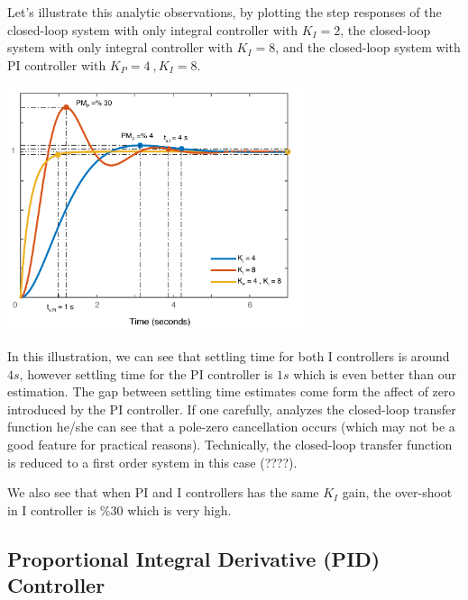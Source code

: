 \documentclass[twoside]{article}
\begin{document}
Let's illustrate this analytic observations, by
plotting the step responses of the
closed-loop system with only integral controller with $K_I = 2$,
the closed-loop system with only integral controller with $K_I = 8$, 
and the closed-loop system with PI controller with $K_P = 4 \ , K_I = 8$. 

\vspace{12 pt}

  \begin{minipage}[h]{1\linewidth}
    \begin{center}
      \includegraphics[width=0.65\textwidth]{IvsPI}
    \end{center}
  \end{minipage}

\vspace{12 pt}

In this illustration, we can see that settling time for both
I controllers is around $4 s$, however settling time for the
PI controller is $1 s$ which is even better than our estimation. 
The gap between settling time estimates come form the affect
of zero introduced by the PI controller. If one carefully, analyzes
the closed-loop transfer function he/she can see that a pole-zero
cancellation occurs (which may not be a good feature for practical
reasons). Technically, the closed-loop transfer function 
is reduced to a first order system in this case (????). 

We also see that when PI and I controllers has the same 
$K_I$ gain, the over-shoot in I controller is $\% 30$ which is very
high. 

\subsection{Proportional Integral Derivative (PID) Controller}
\end{document}
